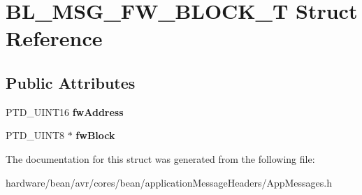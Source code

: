 \hypertarget{struct_b_l___m_s_g___f_w___b_l_o_c_k___t}{}\section{B\+L\+\_\+\+M\+S\+G\+\_\+\+F\+W\+\_\+\+B\+L\+O\+C\+K\+\_\+\+T Struct Reference}
\label{struct_b_l___m_s_g___f_w___b_l_o_c_k___t}
\subsection*{Public Attributes}
\begin{DoxyCompactItemize}
\item 
\hypertarget{struct_b_l___m_s_g___f_w___b_l_o_c_k___t_a95eebace63ad93ca6385a32410a589ce}{}P\+T\+D\+\_\+\+U\+I\+N\+T16 {\bfseries fw\+Address}\label{struct_b_l___m_s_g___f_w___b_l_o_c_k___t_a95eebace63ad93ca6385a32410a589ce}

\item 
\hypertarget{struct_b_l___m_s_g___f_w___b_l_o_c_k___t_ae0a2a8428f4091045c5cb0702cf805e5}{}P\+T\+D\+\_\+\+U\+I\+N\+T8 $\ast$ {\bfseries fw\+Block}\label{struct_b_l___m_s_g___f_w___b_l_o_c_k___t_ae0a2a8428f4091045c5cb0702cf805e5}

\end{DoxyCompactItemize}


The documentation for this struct was generated from the following file\+:\begin{DoxyCompactItemize}
\item 
hardware/bean/avr/cores/bean/application\+Message\+Headers/App\+Messages.\+h\end{DoxyCompactItemize}

